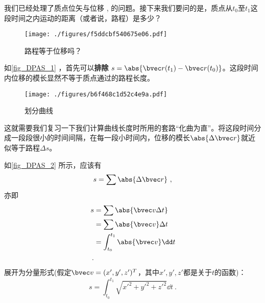 

我们已经处理了质点位矢与位移 , 的问题。接下来我们要问的是，质点从$t_0$至$t_1$这段时间之内运动的距离（或者说，路程）是多少？

\begin{figure}[ht]
\centering
\texttt{[image: ./figures/f5ddcbf540675e06.pdf]}
\caption{路程等于位移吗？} \label{fig_DPAS_1}
\end{figure}

如\autoref{fig_DPAS_1} ，首先可以\textbf{排除} $s = \abs{\bvec r(t_1) - \bvec r(t_0)}  $。这段时间内位移的模长显然不等于质点通过的路程长度。

\begin{figure}[ht]
\centering
\texttt{[image: ./figures/b6f468c1d52c4e9a.pdf]}
\caption{划分曲线} \label{fig_DPAS_2}
\end{figure}

这就需要我们复习一下我们计算曲线长度时所用的套路“化曲为直”。将这段时间分成一段段很小的时间间隔，在每一段小时间内，位移的模长$\abs{\Delta \bvec r}$就近似等于路程$\Delta s$。

如\autoref{fig_DPAS_2} 所示，应该有 $$s=\sum \abs{\Delta \bvec r}~,$$
亦即
$$
\begin{aligned}
s&=\sum \abs{\bvec v \Delta t}\\
&=\sum \abs{\bvec v} \Delta t\\
&=\int _{t_0}^{t_1} \abs{\bvec v} \dd t\\~.
\end{aligned}
$$
展开为分量形式(假定$\bvec v = (x',y',z')^T$，其中$x',y',z'$都是关于$t$的函数)：
$$
s = \int _{t_0}^{t_1} \sqrt{x'^2+y'^2+z'^2} \dd t~.
$$
